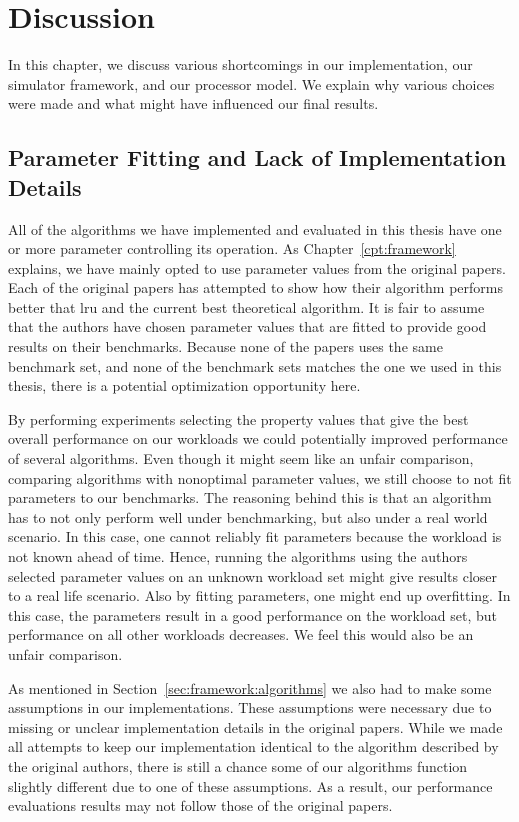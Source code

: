 
\chapter{Discussion}
\label{cpt:discussion}

In this chapter, we discuss various shortcomings in our implementation, our simulator framework, and our processor model.
We explain why various choices were made and what might have influenced our final results.

\section{Parameter Fitting and Lack of Implementation Details}

All of the algorithms we have implemented and evaluated in this thesis have one or more parameter controlling its operation.
As Chapter~\ref{cpt:framework} explains, we have mainly opted to use parameter values from the original papers.
Each of the original papers has attempted to show how their algorithm performs better that \gls{lru} and the current best theoretical algorithm.
It is fair to assume that the authors have chosen parameter values that are fitted to provide good results on their benchmarks.
Because none of the papers uses the same benchmark set, and none of the benchmark sets matches the one we used in this thesis, there is a potential optimization opportunity here.

By performing experiments selecting the property values that give the best overall performance on our workloads we could potentially improved performance of several algorithms.
Even though it might seem like an unfair comparison, comparing algorithms with nonoptimal parameter values, we still choose to not fit parameters to our benchmarks.
The reasoning behind this is that an algorithm has to not only perform well under benchmarking, but also under a real world scenario.
In this case, one cannot reliably fit parameters because the workload is not known ahead of time.
Hence, running the algorithms using the authors selected parameter values on an unknown workload set might give results closer to a real life scenario.
Also by fitting parameters, one might end up overfitting.
In this case, the parameters result in a good performance on the workload set, but performance on all other workloads decreases.
We feel this would also be an unfair comparison.

As mentioned in Section~\ref{sec:framework:algorithms} we also had to make some assumptions in our implementations.
These assumptions were necessary due to missing or unclear implementation details in the original papers.
While we made all attempts to keep our implementation identical to the algorithm described by the original authors, there is still a chance some of our algorithms function slightly different due to one of these assumptions.
As a result, our performance evaluations results may not follow those of the original papers.




